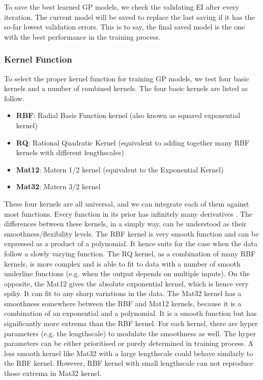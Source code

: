 To save the best learned GP models, we check the validating EI after every iteration. The current model will be saved to replace the last saving if it has the so-far lowest validation errors. This is to say, the final saved model is the one with the best performance in the training process.

\subsubsection{Kernel Function}\label{sec:kernel}

To select the proper kernel function for training GP models, we test four basic kernels and a number of combined kernels. 
%
The four basic kernels are listed as follow. 
\begin{itemize}
\item {\bf RBF}: Radial Basis Function kernel (also known as squared exponential kernel)
\item {\bf RQ}: Rational Quadratic Kernel (equivalent to adding together many RBF kernels with different lengthscales)
\item {\bf Mat12}: Matern 1/2 kernel (equivalent to the Exponential Kernel)
\item {\bf Mat32}: Matern 3/2 kernel 
\end{itemize}
These four kernels are all universal, and we can integrate each of them against most functions. Every function in its prior has infinitely many derivatives  \citep{williams1996gaussian}. The differences between these kernels, in a simply way, can be understood as their smoothness/flexibility levels. The RBF kernel is very smooth function and can be expressed as a product of a polynomial. It hence suits for the case when the data follow a slowly varying function. The RQ kernel, as a combination of many RBF kernels, is more complex and is able to fit to data with a number of smooth underline functions (e.g. when the output depends on multiple inputs). On the opposite, the Mat12 gives the absolute exponential kernel, which is hence very spiky. It can fit to any sharp variations in the data. The Mat32 kernel has a smoothness somewhere between the RBF and Mat12 kernels, because it is a combination of an exponential and a polynomial. It is a smooth function but has significantly more extrema than the RBF kernel. For each kernel, there are hyper parameters (e.g. the lengthscale) to modulate the smoothness as well. The hyper parameters can be either prioritised or purely determined in training process. A less smooth kernel like Mat32 with a large lengthscale could behave similarly to the RBF kernel. However, RBF kernel with small lengthscale can not reproduce those extrema in Mat32 kernel.

